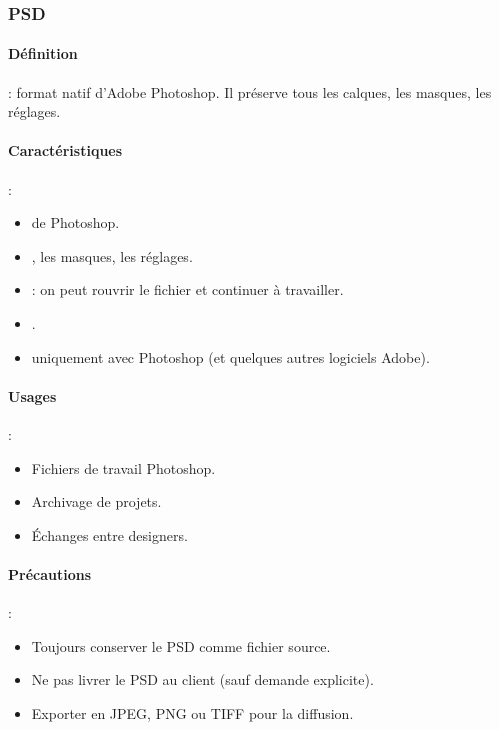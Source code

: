 \subsubsection{PSD}

\paragraph{Définition} : format natif d'Adobe Photoshop. Il préserve tous les calques, les masques, les réglages.

\paragraph{Caractéristiques} :
\begin{itemize}
    \item {} de Photoshop.
    \item {}, les masques, les réglages.
    \item {} : on peut rouvrir le fichier et continuer à travailler.
    \item {}.
    \item {} uniquement avec Photoshop (et quelques autres logiciels Adobe).
\end{itemize}

\paragraph{Usages} :
\begin{itemize}
    \item Fichiers de travail Photoshop.
    \item Archivage de projets.
    \item Échanges entre designers.
\end{itemize}

\paragraph{Précautions} :
\begin{itemize}
    \item Toujours conserver le PSD comme fichier source.
    \item Ne pas livrer le PSD au client (sauf demande explicite).
    \item Exporter en JPEG, PNG ou TIFF pour la diffusion.
\end{itemize}

